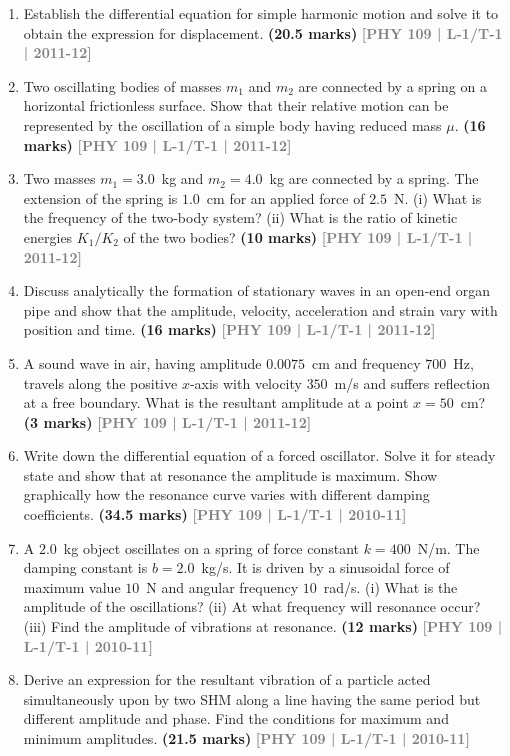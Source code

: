 \documentclass[12pt,a3paper]{article}
\newcommand{\yr}[1]{\hfill\textcolor{gray}{\small\textbf{[#1]}}}
\newcommand{\mk}[1]{\textcolor{orange!70!black}{\small\textbf{(#1 marks)}}}
\begin{document}
\begin{enumerate}
\item Establish the differential equation for simple harmonic motion and solve it to obtain the expression for displacement.
\mk{20.5} \yr{PHY 109 | L-1/T-1 | 2011-12}

\item Two oscillating bodies of masses $m_1$ and $m_2$ are connected by a spring on a horizontal frictionless surface. Show that their relative motion can be represented by the oscillation of a simple body having reduced mass $\mu$.
\mk{16} \yr{PHY 109 | L-1/T-1 | 2011-12}

\item Two masses $m_1 = 3.0$~kg and $m_2 = 4.0$~kg are connected by a spring. The extension of the spring is $1.0$~cm for an applied force of $2.5$~N. (i) What is the frequency of the two-body system? (ii) What is the ratio of kinetic energies $K_1/K_2$ of the two bodies?
\mk{10} \yr{PHY 109 | L-1/T-1 | 2011-12}

\item Discuss analytically the formation of stationary waves in an open-end organ pipe and show that the amplitude, velocity, acceleration and strain vary with position and time.
\mk{16} \yr{PHY 109 | L-1/T-1 | 2011-12}

\item A sound wave in air, having amplitude $0.0075$~cm and frequency $700$~Hz, travels along the positive $x$-axis with velocity $350$~m/s and suffers reflection at a free boundary. What is the resultant amplitude at a point $x = 50$~cm?
\mk{3} \yr{PHY 109 | L-1/T-1 | 2011-12}

\item Write down the differential equation of a forced oscillator. Solve it for steady state and show that at resonance the amplitude is maximum. Show graphically how the resonance curve varies with different damping coefficients.
\mk{34.5} \yr{PHY 109 | L-1/T-1 | 2010-11}

\item A $2.0$~kg object oscillates on a spring of force constant $k = 400$~N/m. The damping constant is $b = 2.0$~kg/s. It is driven by a sinusoidal force of maximum value $10$~N and angular frequency $10$~rad/s. (i) What is the amplitude of the oscillations? (ii) At what frequency will resonance occur? (iii) Find the amplitude of vibrations at resonance.
\mk{12} \yr{PHY 109 | L-1/T-1 | 2010-11}

\item Derive an expression for the resultant vibration of a particle acted simultaneously upon by two SHM along a line having the same period but different amplitude and phase. Find the conditions for maximum and minimum amplitudes.
\mk{21.5} \yr{PHY 109 | L-1/T-1 | 2010-11}


\end{enumerate}
\end{document}
